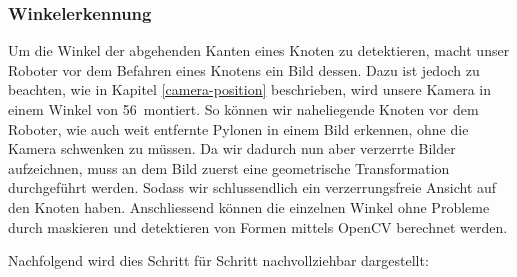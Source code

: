 \subsubsection{Winkelerkennung}\label{winkelerkennung}

Um die Winkel der abgehenden Kanten eines Knoten zu detektieren, macht unser Roboter vor dem Befahren eines Knotens ein Bild dessen. Dazu ist jedoch zu beachten, wie in Kapitel \ref{camera-position} beschrieben, wird unsere Kamera in einem Winkel von 56\textdegree\ montiert. So können wir naheliegende Knoten vor dem Roboter, wie auch weit entfernte Pylonen in einem Bild erkennen, ohne die Kamera schwenken zu müssen.
Da wir dadurch nun aber verzerrte Bilder aufzeichnen, muss an dem Bild zuerst eine geometrische Transformation durchgeführt werden. Sodass wir schlussendlich ein verzerrungsfreie Ansicht auf den Knoten haben. Anschliessend können die einzelnen Winkel ohne Probleme durch maskieren und detektieren von Formen mittels OpenCV berechnet werden.

Nachfolgend wird dies Schritt für Schritt nachvollziehbar dargestellt:

